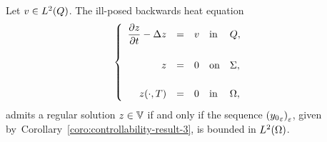 \begin{theoreme}\label{thm:controllability-result-5}%
    Let $v\in L^{2}\!\left({Q}\right)$. The ill-posed backwards heat equation
    \begin{equation}\label{eq:initial-problem-2}
        \begin{cases}\displaystyle
            \begin{array}{rclll}
                \dfrac{\partial{}z}{\partial{}t} - \Delta z & = & v & \text{in} & Q,\\
                \\
                z & = & 0 & \text{on} & \Sigma,\\
                \\
                z(\cdot,T) & = & 0 & \text{in} & \Omega,
            \end{array}
        \end{cases}
    \end{equation}
    admits a regular solution $z\in \mathbb{V}$ if and only if the sequence
    $\displaystyle {\left({{y_{0}}_{\varepsilon}}\right)}_{\varepsilon}$, given
    by~Corollary~\ref{coro:controllability-result-3}, is bounded in
    $L^{2}\!\left({\Omega}\right)$.
\end{theoreme}

